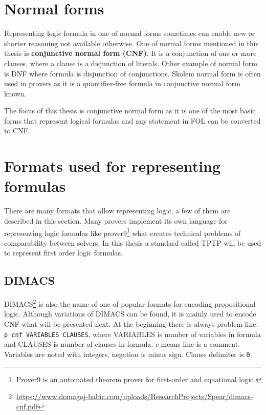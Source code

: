 \section{Normal forms}

Representing logic formula in one of normal forms sometimes can enable new or shorter reasoning not available otherwise. One of normal forms mentioned in this thesis is \textbf{conjunctive normal form (CNF)}. It is a conjunction of one or more clauses, where a clause is a disjunction of literals. Other example of normal form is \gls{DNF} where formula is disjunction of conjunctions. Skolem normal form is often used in provers as it is a quantifier-free formula in conjunctive normal form known.

The focus of this thesis is conjunctive normal form as it is one of the most basic forms that represent logical formulas and any statement in \gls{FOL} can be converted to CNF.

\section{Formats used for representing formulas}

There are many formats that allow representing logic, a few of them are described in this section. Many provers implement its own language for representing logic formulas like prover9\footnote{Prover9 is an automated theorem prover for first-order and equational logic \cite{prover9-mace4}} what creates technical problems of comparability between solvers. In this thesis a standard called \gls{TPTP} will be used to represent first order logic formulas.

\subsection{DIMACS}
\label{sec:DIMACS}

DIMACS\footnote{\url{https://www.domagoj-babic.com/uploads/ResearchProjects/Spear/dimacs-cnf.pdf}} is also the name of one of popular formats for encoding propositional logic. Although variations of DIMACS can be found, it is mainly used to encode CNF what will be presented next. At the beginning there is always problem line:
\texttt{p cnf VARIABLES CLAUSES},
where VARIABLES is number of variables in formula and CLAUSES is number of clauses in formula. $c$ means line is a comment. Variables are noted with integers, negation is minus sign. Clause delimiter is 
\texttt{0}. 

